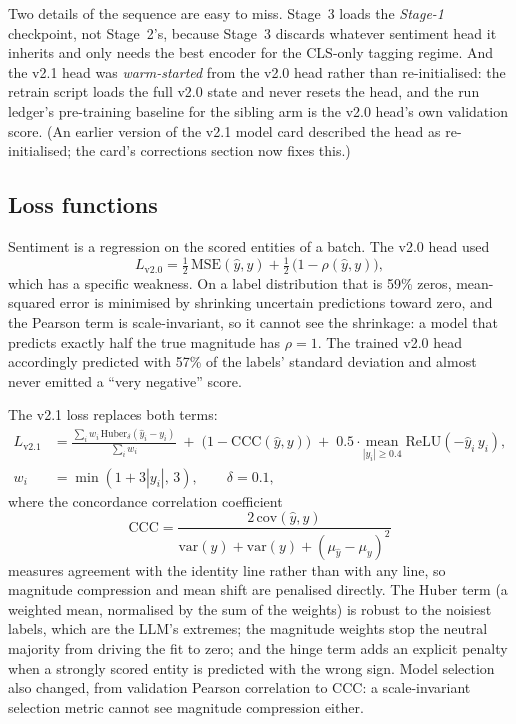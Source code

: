 \documentclass[11pt,letterpaper]{article}
\begin{document}
Two details of the sequence are easy to miss. Stage~3 loads the \emph{Stage-1} checkpoint, not
Stage~2's, because Stage~3 discards whatever sentiment head it inherits and only needs the best
encoder for the CLS-only tagging regime. And the v2.1 head was \emph{warm-started} from the v2.0
head rather than re-initialised: the retrain script loads the full v2.0 state and never resets
the head, and the run ledger's pre-training baseline for the sibling arm is the v2.0 head's own
validation score. (An earlier version of the v2.1 model card described the head as
re-initialised; the card's corrections section now fixes this.)

\subsection{Loss functions}
\label{sec:loss}

Sentiment is a regression on the scored entities of a batch. The v2.0 head used
\begin{equation}
\label{eq:legacy}
L_{\text{v2.0}} = \tfrac12\,\mathrm{MSE}(\hat y, y) + \tfrac12\,\bigl(1-\rho(\hat y, y)\bigr),
\end{equation}
which has a specific weakness. On a label distribution that is 59\% zeros, mean-squared error is
minimised by shrinking uncertain predictions toward zero, and the Pearson term is
scale-invariant, so it cannot see the shrinkage: a model that predicts exactly half the true
magnitude has $\rho = 1$. The trained v2.0 head accordingly predicted with 57\% of the labels'
standard deviation and almost never emitted a ``very negative'' score.

The v2.1 loss replaces both terms:
\begin{equation}
\label{eq:ccchuber}
\begin{aligned}
L_{\text{v2.1}} &= \frac{\sum_i w_i\,\mathrm{Huber}_{\delta}(\hat y_i - y_i)}{\sum_i w_i}
  \;+\; \bigl(1-\mathrm{CCC}(\hat y, y)\bigr)
  \;+\; 0.5 \cdot \underset{|y_i|\ge 0.4}{\mathrm{mean}}\;\mathrm{ReLU}(-\hat y_i\, y_i),\\
w_i &= \min(1+3|y_i|,\,3), \qquad \delta = 0.1,
\end{aligned}
\end{equation}
where the concordance correlation coefficient \cite{lin1989ccc}
\begin{equation}
\mathrm{CCC} = \frac{2\,\mathrm{cov}(\hat y, y)}{\mathrm{var}(\hat y) + \mathrm{var}(y) + (\mu_{\hat y}-\mu_y)^2}
\end{equation}
measures agreement with the identity line rather than with any line, so magnitude compression
and mean shift are penalised directly. The Huber term (a weighted mean, normalised by the sum of
the weights) is robust to the noisiest labels, which are the LLM's extremes; the magnitude
weights stop the neutral majority from driving the fit to zero; and the hinge term adds an
explicit penalty when a strongly scored entity is predicted with the wrong sign. Model selection
also changed, from validation Pearson correlation to CCC: a scale-invariant selection metric
cannot see magnitude compression either.
\end{document}
